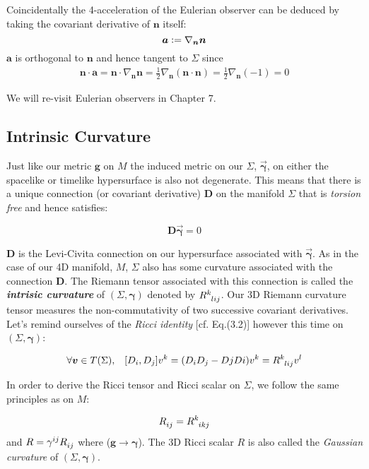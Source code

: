 \documentclass[12pt]{article}
\renewcommand{\vec}[1]{\bm{#1}}
\numberwithin{equation}{section}
\numberwithin{theorem}{subsection}
\newcommand{\defeq}{\vcentcolon=}
\begin{document}
\newline Coincidentally the 4-acceleration of the Eulerian observer can be deduced by taking the covariant derivative of $\vec{n}$ itself: $$\vec{a} \defeq \nabla_{\vec{n}} \vec{n}$$ $\vec{a}$ is orthogonal to $\vec{n}$ and hence tangent to $\Sigma$ since \begin{align}\vec{n} \cdot \vec{a} = \vec{n} \cdot \nabla_{\vec{n}} \vec{n}= \frac{1}{2} \nabla_{\vec{n}}(\vec{n \cdot n}) = \frac{1}{2} \nabla_{\vec{n}}(-1) = 0\end{align}

\smallskip

We will re-visit Eulerian observers in Chapter 7.

\subsection{Intrinsic Curvature}

Just like our metric $\vec{g}$ on $M$ the induced metric on our $\Sigma$, $\overrightarrow{\vec{\gamma}}$, on either the spacelike or timelike hypersurface is also not degenerate. This means that there is a unique connection (or covariant derivative) $\vec{D}$ on the manifold $\Sigma$ that is \textit{torsion free} and hence satisfies:

$$\boxed{\vec{D}\vec{\overrightarrow{\vec{\gamma}}}=0}$$

$\vec{D}$ is the Levi-Civita connection on our hypersurface associated with $\overrightarrow{\vec{\gamma}}$. As in the case of our 4D manifold, $M$, $\Sigma$ also has some curvature associated with the connection $\vec{D}$. The Riemann tensor associated with this connection is called the \textbf{\textit{intrisic curvature}} of $(\Sigma,\vec{\gamma})$ denoted by $\tensor{R}{^k_l_i_j}$. Our 3D Riemann curvature tensor measures the non-commutativity of two successive covariant derivatives. Let's remind ourselves of the \textit{Ricci identity} [cf. Eq.(3.2)] however this time on $(\Sigma,\vec{\gamma})$:

\begin{equation}

    \forall \vec{v} \in T(\Sigma), \; \; \; [D_{i},D_{j}]v^{k} = (D_{i}D_{j}-D{j}D{i})v^{k} = \tensor{R}{^k_l_i_j}v^{l}

\end{equation}

In order to derive the Ricci tensor and Ricci scalar on $\Sigma$, we follow the same principles as on $M$:

$$\tensor{R}{_i_j} = \tensor{R}{^k_i_k_j}$$ and $R = \tensor{\gamma}{^i^j}\tensor{R}{_i_j}$ where ($\vec{g} \rightarrow \vec{\gamma}$). The 3D Ricci scalar $R$ is also called the \textit{Gaussian curvature} of $(\Sigma,\vec{\gamma})$.
\end{document}
